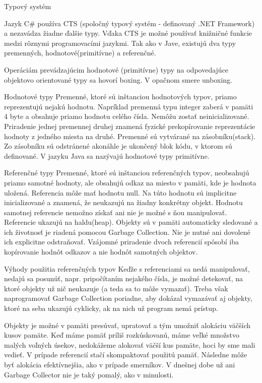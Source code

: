 Typový systém

Jazyk C\# používa CTS (spoločný typový systém - definovaný .NET Framework) a nezavádza žiadne ďalšie typy. Vďaka CTS je možné používať knižničné funkcie medzi rôznymi programovacími jazykmi. Tak ako v Jave, existujú dva typy premenných, hodnotové(primitívne) a referenčné.

Operáciám prevádzajúcim hodnotové (primitívne) typy na odpovedajúce objektovo orientované typy sa hovorí boxing. V opačnom smere unboxing.




Hodnotové typy
Premenné, ktoré sú inštanciou hodnotových typov, priamo reprezentujú nejakú hodnotu. Napríklad premenná typu integer zaberá v pamäti 4 byte a obsahuje priamo hodnotu celého čísla. Nemôžu zostať neinicializované. Priradenie jednej premennej druhej znamená fyzické prekopírovanie reprezentácie hodnoty z jedného miesta na druhé. Premenné sú vytvárané na zásobníku(stack). Zo zásobníku sú odstránené akonáhle je ukončený blok kódu, v ktorom sú definované. V jazyku Java sa nazývajú hodnotové typy primitívne.


Referenčné typy
Premenné, ktoré sú inštanciou referenčných typov, neobsahujú priamo samotné hodnoty, ale obsahujú odkaz na miesto v pamäti, kde je hodnota uložená. Referencia môže mať hodnotu null. Na túto hodnotu sú implicitne inicializované a znamená, že neukazujú na žiadny konkrétny objekt. Hodnotu samotnej referencie nemožno získať ani nie je možné s ňou manipulovať. Referencie ukazujú na haldu(heap). Objekty sú v pamäti automaticky sledované a ich životnosť je riadená pomocou Garbage Collection. Nie je nutné ani dovolené ich explicitne odstraňovať. Vzájomné priradenie dvoch referencií spôsobí iba kopírovanie hodnôt odkazov a nie hodnôt samotných objektov.


Výhody použitia referenčných typov
Keďže s referenciami sa nedá manipulovať, nedajú sa posunúť, napr. pripočítaním nejakého čísla, je možné detekovať, na ktoré objekty už nič neukazuje (a teda sa to môže vymazať). Treba však naprogramovať Garbage Collection poriadne, aby dokázal vymazávať aj objekty, ktoré na seba ukazujú cyklicky, ak na nich už program nemá prístup.

Objekty je možné v pamäti presúvať, upratovať a tým umožniť alokáciu väčších kusov pamäte. Keď máme pamäť príliš rozkúskovanú, máme veľké množstvo malých voľných úsekov, nedokážeme alokovať väčší kus pamäte, hoci by sme mali vedieť. V prípade referencií stačí skompaktovať použitú pamäť. Následne môže byť alokácia efektívnejšia, ako v prípade smerníkov. V dnešnej dobe už ani Garbage Collector nie je taký pomalý, ako v minulosti.

